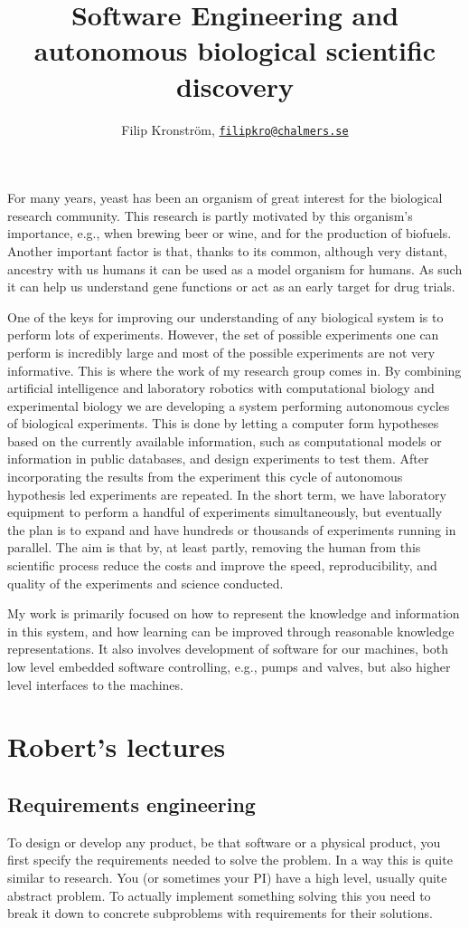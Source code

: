 \documentclass[11pt]{article}
\title{Software Engineering and autonomous biological scientific discovery}
\author{Filip Kronström, \href{mailto:filipkro@chalmers.se}{\nolinkurl{filipkro@chalmers.se}}}
\begin{document}
\maketitle

For many years, yeast has been an organism of great interest for the biological research community. This research is partly motivated by this organism's importance, e.g., when brewing beer or wine, and for the production of biofuels. Another important factor is that, thanks to its common, although very distant, ancestry with us humans it can be used as a model organism for humans. As such it can help us understand gene functions or act as an early target for drug trials.

One of the keys for improving our understanding of any biological system is to perform lots of experiments. However, the set of possible experiments one can perform is incredibly large and most of the possible experiments are not very informative. This is where the work of my research group comes in. By combining artificial intelligence and laboratory robotics with computational biology and experimental biology we are developing a system performing autonomous cycles of biological experiments. This is done by letting a computer form hypotheses based on the currently available information, such as computational models or information in public databases, and design experiments to test them. After incorporating the results from the experiment this cycle of autonomous hypothesis led experiments are repeated. In the short term, we have laboratory equipment to perform a handful of experiments simultaneously, but eventually the plan is to expand and have hundreds or thousands of experiments running in parallel. The aim is that by, at least partly, removing the human from this scientific process reduce the costs and improve the speed, reproducibility, and quality of the experiments and science conducted.

My work is primarily focused on how to represent the knowledge and information in this system, and how learning can be improved through reasonable knowledge representations. It also involves development of software for our machines, both low level embedded software controlling, e.g., pumps and valves, but also higher level interfaces to the machines.

\section*{Robert's lectures}
\subsection*{Requirements engineering}
To design or develop any product, be that software or a physical product, you first specify the requirements needed to solve the problem. In a way this is quite similar to research. You (or sometimes your PI) have a high level, usually quite abstract problem. To actually implement something solving this you need to break it down to concrete subproblems with requirements for their solutions.
\end{document}
